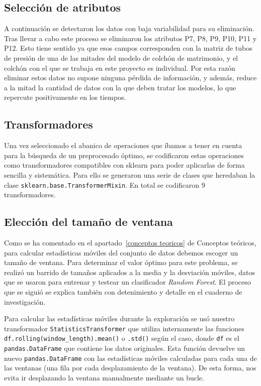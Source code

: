 \subsection{Selección de atributos}

A continuación se detectaron los datos con baja variabilidad para su eliminación. Tras llevar a cabo este proceso se eliminaron los atributos P7, P8, P9, P10, P11 y P12. Esto tiene sentido ya que esos campos corresponden con la matriz de tubos de presión de una de las mitades del modelo de colchón de matrimonio, y el colchón con el que se trabaja en este proyecto es individual. Por esta razón eliminar estos datos no supone ninguna pérdida de información, y además, reduce a la mitad la cantidad de datos con la que deben tratar los modelos, lo que repercute positivamente en los tiempos. 

\subsection{Transformadores}

Una vez seleccionado el abanico de operaciones que íbamos a tener en cuenta para la búsqueda de un preprocesado óptimo, se codificaron estas operaciones como transformadores compatibles con sklearn para poder aplicarlas de forma sencilla y sistemática. Para ello se generaron una serie de clases que heredaban la clase \texttt{sklearn.base.TransformerMixin}. En total se codificaron 9 transformadores. 


\subsection{Elección del tamaño de ventana}

Como se ha comentado en el apartado~\ref{conceptos teoricos} de Conceptos teóricos, para calcular estadísticas móviles del conjunto de datos debemos escoger un tamaño de ventana. Para determinar el valor óptimo para este problema, se realizó un barrido de tamaños aplicados a la media y la desviación móviles, datos que se usaron para entrenar y testear un clasificador \textit{Random Forest}. El proceso que se siguió se explica también con detenimiento y detalle en el cuaderno de investigación. 

Para calcular las estadísticas móviles durante la exploración se usó nuestro transformador \texttt{StatisticsTransformer} que utiliza internamente las funciones  \texttt{df.rolling(window\_length).mean()} o \texttt{.std()} según el caso, donde \texttt{df} es el \texttt{pandas.DataFrame} que contiene los datos originales. Esta función devuelve un nuevo \texttt{pandas.DataFrame} con las estadísticas móviles calculadas para cada una de las ventanas (una fila por cada desplazamiento de la ventana). De esta forma, nos evita ir desplazando la ventana manualmente mediante un bucle. 

